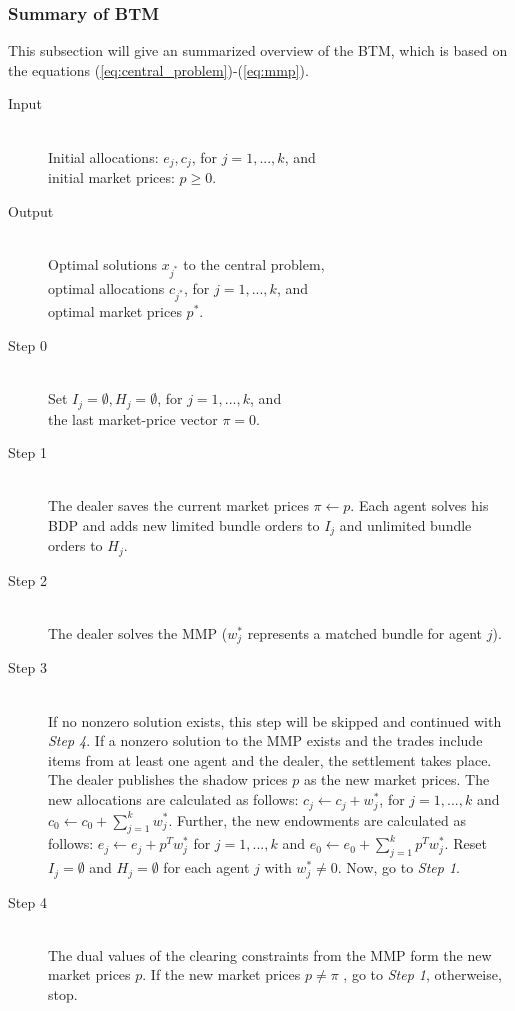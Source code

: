 \subsubsection{Summary of BTM}
\label{sec:summary_of_btm}
This subsection will give an summarized overview of the BTM, which 
is based on the equations (\ref{eq:central_problem})-(\ref{eq:mmp}).

\begin{description}
 \item[Input] \hfill \\
 Initial allocations: $e_{j}, c_{j}$, for $j=1,...,k$, and \\
 initial market prices: $p \geq 0$.
 \item[Output] \hfill \\
 Optimal solutions $x_{j^{*}}$ to the central problem, \\
 optimal allocations $c_{j^{*}}$, for $j=1,...,k$, and \\
 optimal market prices $p^{*}$.
 \item[Step 0] \hfill \\
 Set $I_{j} = \emptyset, H_{j} = \emptyset$, for $j=1,...,k$, and \\
 the last market-price vector $\pi = 0$.
 \item[Step 1] \hfill \\
 The dealer saves the current market prices $\pi \leftarrow p$. Each agent solves his 
 BDP and adds new limited bundle orders to $I_{j}$ and 
 unlimited bundle orders to $H_{j}$.
 \item[Step 2] \hfill \\
 The dealer solves the MMP ($w_{j}^{*}$ represents a matched bundle for agent $j$). 
 \item[Step 3] \hfill \\
 If no nonzero solution exists, this step will be skipped and continued with \textit{Step 4}.
 If a nonzero solution to the MMP exists and the trades include items from at least one agent and the dealer, the settlement takes place. 
 The dealer publishes the shadow prices $p$ as the new market prices.
 The new allocations are calculated as follows:
 $c_{j} \leftarrow c_{j} + w_{j}^{*}$, for $j=1,...,k$ and $c_{0} \leftarrow c_{0} + \sum\limits_{j=1}^{k} w_{j}^{*}$.
 Further, the new endowments are calculated as follows:
 $e_{j} \leftarrow e_{j} + p^{T} w_{j}^{*}$ for $j=1,...,k$ and $e_{0} \leftarrow e_{0} + \sum\limits_{j=1}^{k} p^{T} w_{j}^{*}$.
 Reset $I_{j} = \emptyset$ and $H_{j} = \emptyset$ for each agent $j$ with $w_{j}^{*} \neq 0$.
 Now, go to \textit{Step 1}. 
 \item[Step 4] \hfill \\
 The dual values of the clearing constraints from the MMP form the new market prices $p$. 
 If the new market prices $p \neq \pi$ , go to \textit{Step 1}, otherweise, stop.
\end{description}


\clearpage